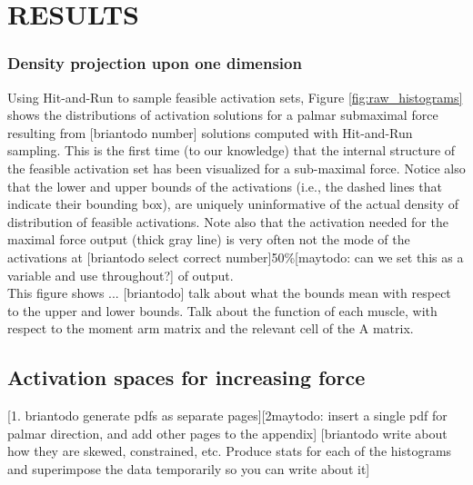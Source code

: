 

\section{RESULTS}
\subsubsection{Density projection upon one dimension} %
\label{ssub:density_projection_upon_one_dimension}

Using Hit-and-Run to sample feasible activation sets, Figure \ref{fig:raw_histograms} shows the distributions of activation solutions for a palmar submaximal force resulting from [briantodo number] solutions computed with Hit-and-Run sampling. This is the first time (to our knowledge) that the internal structure of the feasible activation set has been visualized for a sub-maximal force.
Notice also that the lower and upper bounds of the activations (i.e., the dashed lines that indicate their bounding box), are uniquely uninformative of the actual density of distribution of feasible activations. Note also that the activation needed for the maximal force output (thick gray line) is very often not the mode of the activations at [briantodo select correct number]50\%[maytodo: can we set this as a variable and use throughout?] of output.
\\
This figure shows ... [briantodo]
talk about what the bounds mean with respect to the upper and lower bounds.
Talk about the function of each muscle, with respect to the moment arm matrix and the relevant cell of the A matrix.


\subsection{Activation spaces for increasing force} %
\label{sub:activation_spaces_for_increasing_force}

[1. briantodo generate pdfs as separate pages][2maytodo: insert a single pdf for palmar direction, and add other pages to the appendix]
[briantodo write about how they are skewed, constrained, etc. Produce stats for each of the histograms and superimpose the data temporarily so you can write about it]

